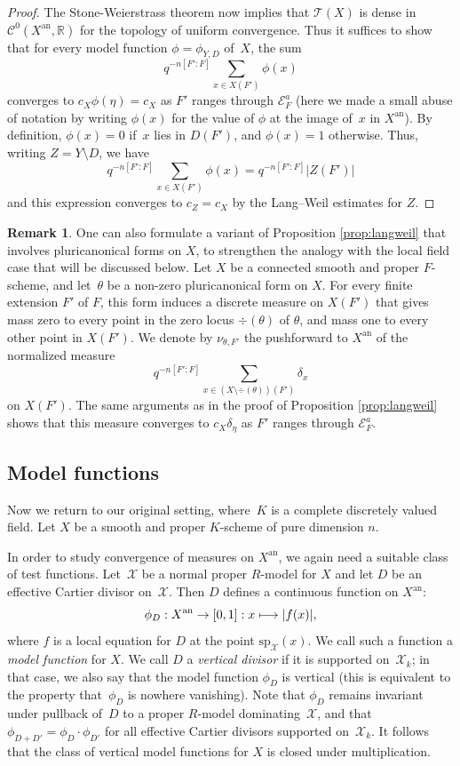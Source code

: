 \documentclass[11pt]{article}
\let\mathcal\mathscr
\newcommand{\mto}{\mathchoice{\longmapsto}{\mapsto}{\mapsto}{\mapsto}}
\theoremstyle{definition}
\newtheorem{remark}[equation]{Remark}
\numberwithin{equation}{subsection}
\newcommand{\R}{\ensuremath{\mathbb{R}}}
\newcommand{\cX}{\ensuremath{\mathscr{X}}}
\newcommand{\an}{\mathrm{an}}
\newcommand{\spe}{\mathrm{sp}}
\let\form\theta
\begin{document}
\begin{proof}
The Stone-Weierstrass theorem now implies that $\mathcal{T}(X)$ is dense in
$\mathcal{C}^0(X^{\an},\R)$ for the topology of uniform convergence. Thus it suffices to show that for every model function $\phi=\phi_{Y,D}$ of~$X$, the sum
\[
q^{-n[F'\colon F]}\sum_{x\in X(F')}\phi(x)
\]
converges to $c_X\phi(\eta)=c_X$
as $F'$ ranges through $\mathcal{E}^a_F$ (here we made a small abuse of notation by writing $\phi(x)$ for the value of $\phi$ at the image of~$x$ in $X^{\an}$).
By definition, $\phi(x)=0$ if~$x$ lies in $D(F')$, and $\phi(x)=1$ otherwise.
Thus, writing $Z=Y\setminus D$, we have
\[
q^{-n[F'\colon F]}\sum_{x\in X(F')}\phi(x)=q^{-n[F'\colon F]}|Z(F')|
\]
and this expression converges to $c_Z=c_X$ by the Lang--Weil estimates for $Z$.
\end{proof}

\begin{remark}
One can also formulate a variant of Proposition \ref{prop:langweil} that involves pluricanonical forms on $X$, to strengthen the analogy with the local field case that will be discussed below. Let $X$ be a connected smooth and proper $F$-scheme, and let~$\form$ be a non-zero pluricanonical form on $X$. For every finite extension $F'$ of $F$, this form induces a discrete measure on $X(F')$ that gives mass zero to every point in the zero locus $\div(\form)$ of $\form$, and mass one to every other point in $X(F')$.
We denote by $\nu_{\form,F'}$
the pushforward to $X^{\an}$ of the normalized measure
\[
q^{-n[F'\colon F]}\sum_{x\in (X\setminus \div(\form))(F')}\delta_x
\]
on $X(F')$.
The same arguments as in the proof of Proposition \ref{prop:langweil} shows that this measure converges to $c_X\delta_{\eta}$ as $F'$ ranges through $\mathcal{E}_F^a$.
\end{remark}

\subsection{Model functions}
Now we return to our original setting, where~$K$ is a complete discretely valued field.
Let $X$ be a smooth and proper $K$\nobreakdash-scheme of pure dimension $n$.

In order to study convergence of measures on $X^{\an}$, we again need a suitable class of test functions.
Let~$\cX$ be a normal proper $R$\nobreakdash-model for $X$ and let $D$ be an effective Cartier divisor on~$\cX$. Then $D$ defines a continuous function on $X^{\an}$:
\[
\phi_D:X^{\an}\to [0,1]:x\mto |f(x)|,
\]
where $f$ is a local equation for $D$ at the point $\spe_{\cX}(x)$. We call such a function a {\em model function} for $X$.
We call $D$ a {\em vertical divisor} if it is supported on~$\cX_k$;
in that case, we also say that the model function $\phi_D$ is vertical (this is equivalent to the property that~$\phi_D$ is nowhere vanishing).
Note that $\phi_D$ remains invariant under pullback of~$D$ to a proper $R$\nobreakdash-model dominating~$\cX$, and that $\phi_{D+D'}=\phi_D\cdot \phi_{D'}$ for all
effective Cartier divisors supported on~$\cX_k$. It follows that the class of vertical model functions for $X$ is closed under multiplication.
\end{document}
